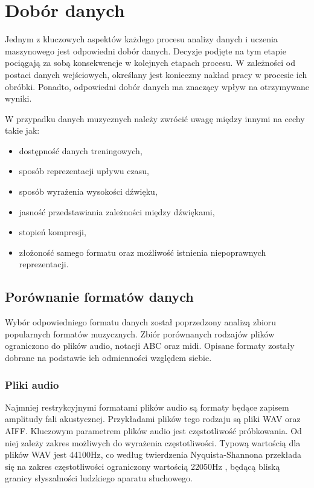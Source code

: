 \chapter {Dobór danych}\label{chap:data}
{
    Jednym z kluczowych aspektów każdego procesu analizy danych i uczenia maszynowego
    jest odpowiedni dobór danych. Decyzje podjęte na tym etapie pociągają za sobą 
    konsekwencje w kolejnych etapach procesu. W zależności od postaci danych wejściowych,
    określany jest konieczny nakład pracy w procesie ich obróbki. 
    Ponadto, odpowiedni dobór danych ma znaczący wpływ na otrzymywane wyniki.

    W przypadku danych muzycznych należy zwrócić uwagę między innymi na cechy takie jak:
    \begin{itemize}
        \setlength\itemsep{-0.5em}
        \item dostępność danych treningowych,
        \item sposób reprezentacji upływu czasu,
        \item sposób wyrażenia wysokości dźwięku,
        \item jasność przedstawiania zależności między dźwiękami,
        \item stopień kompresji,
        \item złożoność samego formatu oraz możliwość istnienia niepoprawnych reprezentacji.
    \end{itemize}

    \section{Porównanie formatów danych}
    {
        Wybór odpowiedniego formatu danych został poprzedzony analizą zbioru popularnych formatów muzycznych.
        Zbiór porównanych rodzajów plików ograniczono do plików audio, notacji ABC oraz midi.
        Opisane formaty zostały dobrane na podstawie ich odmienności względem siebie.

        \subsection{Pliki audio}
        {
            Najmniej restrykcyjnymi formatami plików audio są formaty będące zapisem
            amplitudy fali akustycznej. Przykładami plików tego rodzaju są pliki WAV
            oraz AIFF.
            Kluczowym parametrem plików audio jest częstotliwość próbkowania. Od niej
            zależy zakres możliwych do wyrażenia częstotliwości. Typową wartością dla plików
            WAV jest 44100Hz, co według twierdzenia Nyquista-Shannona przekłada się na zakres
            częstotliwości ograniczony wartością 22050Hz \cite{Shannon1949CommunicationIT}, będącą bliską granicy słyszalności
            ludzkiego aparatu słuchowego. 

}}}
